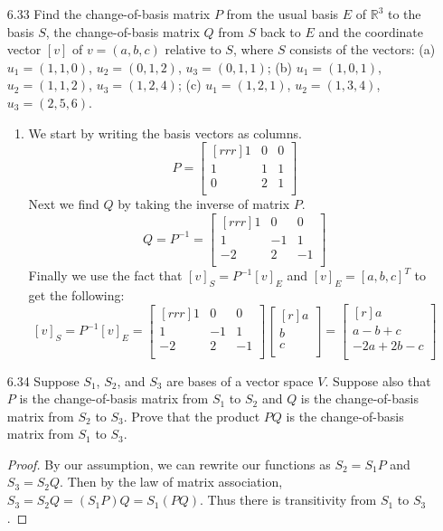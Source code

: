 \documentclass[12pt]{article}
\theoremstyle{definition}
\theoremstyle{plain}
\begin{document}
\begin{enumerate}
\item[6.33] Find the change-of-basis matrix $P$ from the usual basis $E$ of $\mathbb{R}^3$ to the basis $S$, the change-of-basis matrix $Q$ from $S$ back to $E$ and the coordinate vector $[v]$ of $v=(a,b,c)$ relative to $S$, where $S$ consists of the vectors: (a) $u_1=(1,1,0)$, $u_2=(0,1,2)$, $u_3=(0,1,1)$; (b) $u_1=(1,0,1)$, $u_2=(1,1,2)$, $u_3=(1,2,4)$; (c) $u_1=(1,2,1)$, $u_2=(1,3,4)$, $u_3=(2,5,6)$.
	\begin{enumerate}
	\item We start by writing the basis vectors as columns.
	\[ P = \begin{bmatrix}[rrr]1&0&0\\1&1&1\\0&2&1\\\end{bmatrix} \]
	Next we find $Q$ by taking the inverse of matrix $P$.
	\[ Q = P^{-1} = \begin{bmatrix}[rrr]1&0&0\\1&-1&1\\-2&2&-1\\\end{bmatrix} \]
	Finally we use the fact that $[v]_S = P^{-1}[v]_E$ and $[v]_E=[a,b,c]^T$ to get the following:
	\[ [v]_S=P^{-1}[v]_E = \begin{bmatrix}[rrr]1&0&0\\1&-1&1\\-2&2&-1\\\end{bmatrix}\begin{bmatrix}[r]a\\b\\c\\\end{bmatrix} = \begin{bmatrix}[r]a\\a-b+c\\-2a+2b-c\\\end{bmatrix} \]
	\end{enumerate}
	
\item[6.34] Suppose $S_1$, $S_2$, and $S_3$ are bases of a vector space $V$. Suppose also that $P$ is the change-of-basis matrix from $S_1$ to $S_2$ and $Q$ is the change-of-basis matrix from $S_2$ to $S_3$. Prove that the product $PQ$ is the change-of-basis matrix from $S_1$ to $S_3$.
	\begin{proof}
	By our assumption, we can rewrite our functions as $S_2=S_1P$ and $S_3=S_2Q$. Then by the law of matrix association, $S_3=S_2Q=(S_1P)Q=S_1(PQ)$. Thus there is transitivity from $S_1$ to $S_3$. 
	\end{proof}


\end{enumerate}
\end{document}
